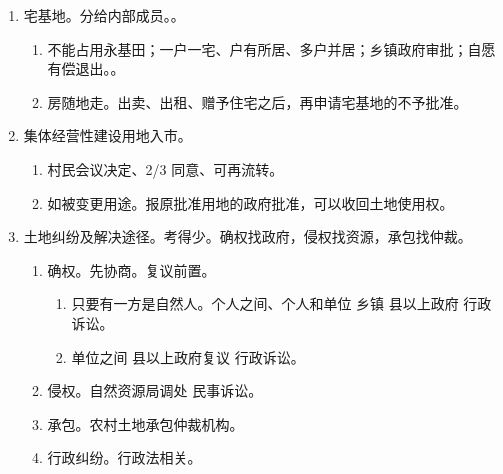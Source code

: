 \begin{enumerate}
\begin{enumerate}
                \begin{enumerate}
                  \item 范围。
                        \begin{enumerate}
                          \item 粮、棉、油、糖、蔬菜生产基地。
                          \item 有良好水利与水土保持设施的耕地，正在改造以及可以改造的中、低产田和已建成的高标准农田。
                          \item 农业科研、教学试验田、国务院规定的其他耕地。
                        \end{enumerate}
                  \item 占本行政区域耕地的80\%、以乡 \hz 镇为单位划定、具体到地块。
                  \item 改变用途 \hz 征收 \yjt 找国务院。
                  \item 禁止挖塘养鱼、种果树。
                  \item 禁止闲置、荒芜。1 年 \yjt 能种就种。1 年+ \yjt 闲置费。2 年 \yjt 无偿收回。
                \end{enumerate}
        \end{enumerate}
  \item 宅基地。分给内部成员。。
        \begin{enumerate}
          \item 不能占用永基田；一户一宅、户有所居、多户并居；乡镇政府审批；自愿有偿退出。。
          \item 房随地走。出卖、出租、赠予住宅之后，再申请宅基地的不予批准。
        \end{enumerate}
  \item 集体经营性建设用地入市。
        \begin{enumerate}
          \item 村民会议决定、2/3 同意、可再流转。
          \item 如被变更用途。报原批准用地的政府批准，可以收回土地使用权。
        \end{enumerate}
  \item 土地纠纷及解决途径。考得少。确权找政府，侵权找资源，承包找仲裁。
        \begin{enumerate}
          \item 确权。先协商。复议前置。
                \begin{enumerate}
                  \item 只要有一方是自然人。个人之间、个人和单位 \yjt 乡镇 \hz 县以上政府 \yjt 行政诉讼。
                  \item 单位之间 \yjt 县以上政府复议 \yjt 行政诉讼。
                \end{enumerate}
          \item 侵权。自然资源局调处 \hz 民事诉讼。
          \item 承包。农村土地承包仲裁机构。
          \item 行政纠纷。行政法相关。
        \end{enumerate}
\end{enumerate}
